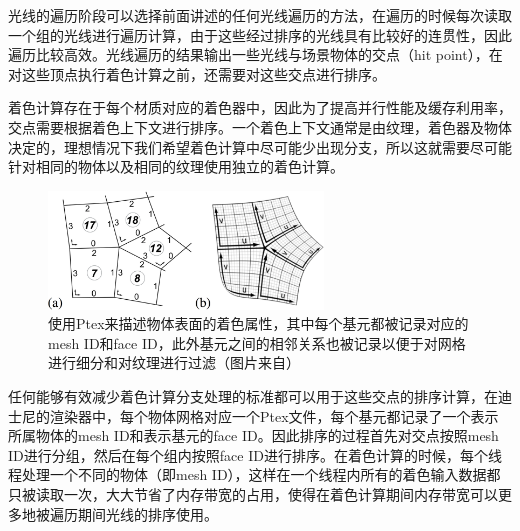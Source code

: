 光线的遍历阶段可以选择前面讲述的任何光线遍历的方法，在遍历的时候每次读取一个组的光线进行遍历计算，由于这些经过排序的光线具有比较好的连贯性，因此遍历比较高效。光线遍历的结果输出一些光线与场景物体的交点（hit point），在对这些顶点执行着色计算之前，还需要对这些交点进行排序。

着色计算存在于每个材质对应的着色器中，因此为了提高并行性能及缓存利用率，交点需要根据着色上下文进行排序。一个着色上下文通常是由纹理，着色器及物体决定的，理想情况下我们希望着色计算中尽可能少出现分支，所以这就需要尽可能针对相同的物体以及相同的纹理使用独立的着色计算。

\begin{figure}
	\sidecaption
	\includegraphics[width=0.65\textwidth]{figures/pt/path-12}
	\caption{使用Ptex来描述物体表面的着色属性，其中每个基元都被记录对应的mesh ID和face ID，此外基元之间的相邻关系也被记录以便于对网格进行细分和对纹理进行过滤（图片来自\cite{a:SortedDeferredShadingforProductionPathTracing}）}
	\label{f:ptex}
\end{figure}

任何能够有效减少着色计算分支处理的标准都可以用于这些交点的排序计算，在迪士尼的渲染器中，每个物体网格对应一个Ptex文件\cite{a:Ptex:PerFaceTextureMappingforProductionRendering}，每个基元都记录了一个表示所属物体的mesh ID和表示基元的face ID。因此排序的过程首先对交点按照mesh ID进行分组，然后在每个组内按照face ID进行排序。在着色计算的时候，每个线程处理一个不同的物体（即mesh ID），这样在一个线程内所有的着色输入数据都只被读取一次，大大节省了内存带宽的占用，使得在着色计算期间内存带宽可以更多地被遍历期间光线的排序使用。

